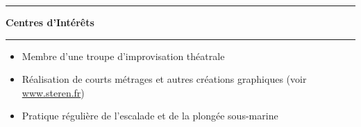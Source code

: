 \documentclass[a4paper,11pt]{article} %
\newcommand{\trad}[2]{#2}
\newcommand{\titre}[1]{%
	\begin{center}
	\rule{\textwidth}{1pt}
	\par
	\vspace{0.1cm}
        \textbf{\large #1}
	\par\rule{\textwidth}{1pt}
	\end{center}
	}
\newenvironment{customitemize}[0]
  { \begin{itemize}
    \addtolength{\itemsep}{\trad{-0.2}{0}\baselineskip}
    \addtolength{\baselineskip}{\trad{-0.2}{0}\baselineskip} }
  { \end{itemize} }
\begin{document}
\titre{\trad{Interests}{Centres d'Intérêts}}


	\begin{customitemize}
	\item \trad{Member of an improvisational theater company (4 years)}           								{Membre d'une troupe d'improvisation théatrale}
	\item \trad{Direction of short films (traditional or computer generated) and other graphical creations (see \href{http://www.steren.fr}{www.steren.fr})}   	{Réalisation de courts métrages et autres créations graphiques (voir \href{http://www.steren.fr}{www.steren.fr})} %
	\item \trad{Regular practice of rock climbing (3 years) and scuba diving (8 years)}           				{Pratique régulière de l'escalade et de la plongée sous-marine}
	\end{customitemize}

	

\end{document}
